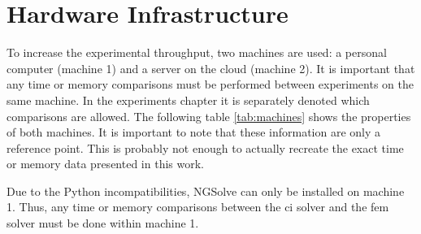 \documentclass[./\jobname.tex]{subfiles}
\begin{document}
\section{Hardware Infrastructure}
\label{chap:hardware_setup}

To increase the experimental throughput, two machines are used: a personal computer (machine 1) and a server on the cloud (machine 2). It is important that any time or memory comparisons must be performed between experiments on the same machine. In the experiments chapter it is separately denoted which comparisons are allowed. The following table \ref{tab:machines} shows the properties of both machines. It is important to note that these information are only a reference point. This is probably not enough to actually recreate the exact time or memory data presented in this work. 

\begin{table}[h]
	\centering
	\noindent{}
	\label{tab:machines}
\end{table}

Due to the Python incompatibilities, NGSolve can only be installed on machine 1. Thus, any time or memory comparisons between the \gls{ci} solver and the \gls{fem} solver must be done within machine 1. 
\end{document}
